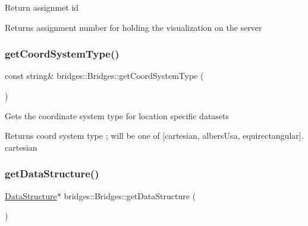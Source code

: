 Return assignmet id

\begin{DoxyReturn}{Returns}
assignment number for holding the visualization on the server 
\end{DoxyReturn}
\mbox{\label{classbridges_1_1_bridges_aac3cdb607177ff537f5160c3790d814a}} 
\subsubsection{\texorpdfstring{get\+Coord\+System\+Type()}{getCoordSystemType()}}
{\footnotesize\ttfamily const string\& bridges\+::\+Bridges\+::get\+Coord\+System\+Type (\begin{DoxyParamCaption}{ }\end{DoxyParamCaption})\hspace{0.3cm}{\ttfamily [inline]}}

Gets the coordinate system type for location specific datasets

\begin{DoxyReturn}{Returns}
coord system type ; will be one of \mbox{[}\textquotesingle{}cartesian\textquotesingle{}, \textquotesingle{}albers\+Usa\textquotesingle{}, \textquotesingle{}equirectangular\textquotesingle{}\mbox{]}. \textquotesingle{}cartesian\textquotesingle{} 
\end{DoxyReturn}
\mbox{\label{classbridges_1_1_bridges_a5ddfb17c2fb2d3ca89e7564677251dea}} 
\subsubsection{\texorpdfstring{get\+Data\+Structure()}{getDataStructure()}}
{\footnotesize\ttfamily \mbox{\hyperlink{classbridges_1_1datastructure_1_1_data_structure}{Data\+Structure}}$\ast$ bridges\+::\+Bridges\+::get\+Data\+Structure (\begin{DoxyParamCaption}{ }\end{DoxyParamCaption})\hspace{0.3cm}{\ttfamily [inline]}}

